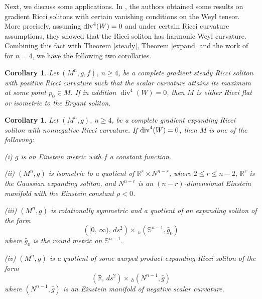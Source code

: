 \documentclass{amsart}
\newtheorem{corollary}[theorem]{Corollary}
\theoremstyle{definition}
\theoremstyle{remark}
\numberwithin{equation}{section}
\begin{document}
Next, we discuss some applications. 
In \cite{CMM}, the authors obtained some results on gradient Ricci solitons with certain vanishing conditions on the Weyl tensor. More precisely, assuming ${\rm div}^4(W)=0$ and under certain Ricci curvature assumptions,
they showed that the Ricci soliton has harmonic Weyl curvature. 
Combining this fact with Theorem \ref{steady}, Theorem \ref{expand}  and the work of \cite{Kim} for $n=4$, we have the following two corollaries. 

\begin{corollary}\label{cor1.4}
	Let $(M^n,g,f)$, $n\geq 4$, be a complete gradient steady Ricci soliton 
	with positive Ricci curvature such that the scalar curvature attains its maximum at some point $p_0\in M$. 
	If in addition $\operatorname{div}^4(W)=0$, then $M$ is either Ricci flat or isometric to the Bryant soliton.
\end{corollary}

\begin{corollary}\label{cor1.6}
	Let $(M^n,g)$, $n\geq 4$, be a complete gradient expanding Ricci soliton with nonnegative Ricci curvature. 
	If ${\rm div}^4(W)=0$, then $M$ is one of the following: 
	
	\smallskip
	{\rm (i)} $g$ is an Einstein metric with $f$ a constant function.
	
	\smallskip	
	{\rm (ii)} $(M^n, g)$ is isometric to a quotient of 
	$ \mathbb{R}^{r} \times {N}^{n-r}$,
	where $2 \leq r\leq n-2$, $ \mathbb{R}^{r}$ is the Gaussian expanding soliton,
	and ${N}^{n-r}$ is an $(n-r)$-dimensional Einstein
	manifold with the Einstein constant $\rho < 0$.	
	
	\smallskip	
	{\rm (iii)} $(M^n, g)$ is rotationally symmetric and a quotient of an expanding soliton of the form
	\[
	\left( [0,\, \infty),\, ds^2 \right) \times \,_h\left(\mathbb{S}^{n-1}, \bar{g}_0 \right) 
	\]
	where $\bar{g}_0$ is the round metric on $\mathbb{S}^{n-1}$.
	
	\smallskip
	{\rm (iv)} $(M^n, g)$ is a quotient of some warped product expanding Ricci soliton of the form
	\[
	\left(\mathbb{R} ,\, ds^2 \right) \times \, _h\left(N^{n-1}, \bar{g} \right) 
	\]
	where $\left(N^{n-1}, \bar{g} \right) $ is an Einstein manifold of negative scalar curvature.
\end{corollary}
	
\end{document}
